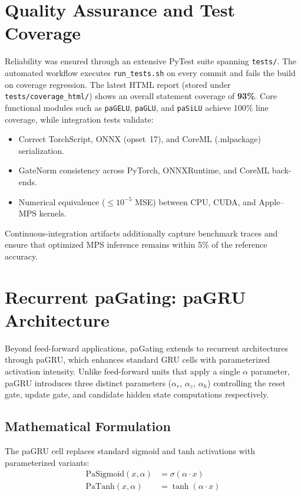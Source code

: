\documentclass[lettersize,journal]{IEEEtran}
\begin{document}
\section{Quality Assurance and Test Coverage}
\label{sec:qa}

Reliability was ensured through an extensive PyTest suite spanning \texttt{tests/}.  The automated workflow executes \texttt{run\_tests.sh} on every commit and fails the build on coverage regression.  The latest HTML report (stored under \texttt{tests/coverage\_html/}) shows an overall statement coverage of \textbf{93\%}.  Core functional modules such as \texttt{paGELU}, \texttt{paGLU}, and \texttt{paSiLU} achieve 100\% line coverage, while integration tests validate:

\begin{itemize}
\item Correct TorchScript, ONNX (opset~17), and CoreML (.mlpackage) serialization.
\item GateNorm consistency across PyTorch, ONNXRuntime, and CoreML back-ends.
\item Numerical equivalence ($\le10^{-5}$ MSE) between CPU, CUDA, and Apple–MPS kernels.
\end{itemize}

Continuous-integration artifacts additionally capture benchmark traces and ensure that optimized MPS inference remains within 5\% of the reference accuracy.

\section{Recurrent paGating: paGRU Architecture}
\label{sec:pagru}

Beyond feed-forward applications, paGating extends to recurrent architectures through paGRU, which enhances standard GRU cells with parameterized activation intensity. Unlike feed-forward units that apply a single $\alpha$ parameter, paGRU introduces three distinct parameters ($\alpha_r$, $\alpha_z$, $\alpha_h$) controlling the reset gate, update gate, and candidate hidden state computations respectively.

\subsection{Mathematical Formulation}
The paGRU cell replaces standard sigmoid and tanh activations with parameterized variants:
\begin{align}
\text{PaSigmoid}(x, \alpha) &= \sigma(\alpha \cdot x) \\
\text{PaTanh}(x, \alpha) &= \tanh(\alpha \cdot x)
\end{align}
\end{document}
